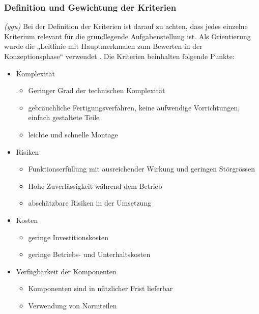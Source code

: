 \subsubsection{Definition und Gewichtung der Kriterien}
\textit{(ygu)} Bei der Definition der Kriterien ist darauf zu achten, dass jedes einzelne Kriterium relevant für die grundlegende Aufgabenstellung ist.
Als Orientierung wurde die „Leitlinie mit Hauptmerkmalen zum Bewerten in der Konzeptionsphase“ verwendet \cite{pahl}. 
\newline
Die Kriterien beinhalten folgende Punkte:
\begin{itemize}
	\item Komplexität
	\begin{itemize}
		\item Geringer Grad der technischen Komplexität
		
		\item gebräuchliche Fertigungsverfahren, keine aufwendige Vorrichtungen, einfach gestaltete Teile
		
		\item leichte und schnelle Montage
	\end{itemize}

	\item Risiken
	\begin{itemize}
	\item Funktionserfüllung mit ausreichender Wirkung und geringen Störgrössen
	
	\item Hohe Zuverlässigkeit während dem Betrieb
	
	\item abschätzbare Risiken in der Umsetzung
	\end{itemize}

	\item Kosten
	\begin{itemize}
	\item geringe Investitionskosten
	
	\item geringe Betriebs- und Unterhaltskosten
	\end{itemize}

	\item Verfügbarkeit der Komponenten
	\begin{itemize}
	\item Komponenten sind in nützlicher Frist lieferbar
	
	\item Verwendung von Normteilen
	

\end{itemize}
\end{itemize}
